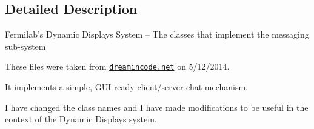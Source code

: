 \subsection{Detailed Description}
Fermilab's Dynamic Displays System -- The classes that implement the messaging sub-\/system

These files were taken from \href{http://www.dreamincode.net/forums/topic/259777-a-simple-chat-program-with-clientserver-gui-optional/}{\tt dreamincode.\-net} on 5/12/2014.

It implements a simple, G\-U\-I-\/ready client/server chat mechanism.

I have changed the class names and I have made modifications to be useful in the context of the Dynamic Displays system.